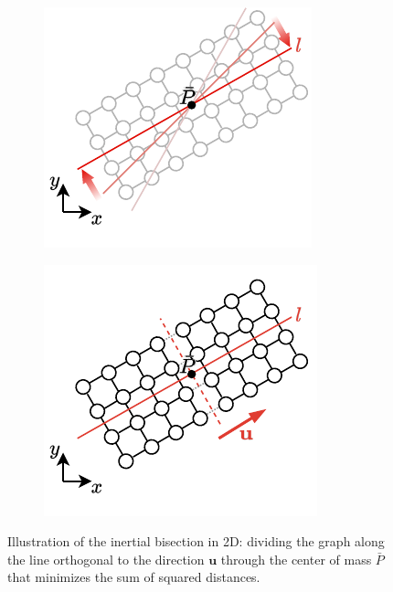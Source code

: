 \begin{figure}[h!]
    \centering
    \begin{subfigure}[b]{0.23\textwidth}
        \centering
        \includegraphics[width=\textwidth]{images/inert_0.drawio.svg.pdf}
        \label{fig:inert_1}
    \end{subfigure}
    \hfill
    \begin{subfigure}[b]{0.23\textwidth}
        \centering
        \includegraphics[width=\textwidth]{images/inert.drawio.svg.pdf}
        \label{fig:inert_2}
    \end{subfigure}
    \caption{Illustration of the inertial bisection in 2D: dividing the graph
    along the line orthogonal to the direction $\mathbf{u}$ through the center of mass $\bar{P}$ that minimizes the sum of squared distances.}
    \label{fig:inert}
\end{figure}